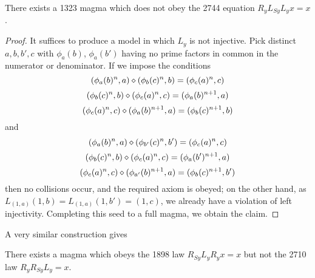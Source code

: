 \begin{corollary}\label{1323-refute-2744}  There exists a 1323 magma which does not obey the 2744 equation $R_y L_{Sy} L_y x = x$.
\end{corollary}

\begin{proof} It suffices to produce a model in which $L_y$ is not injective. Pick distinct $a, b, b', c$ with $\phi_a(b)$, $\phi_a(b')$ having no prime factors in common in the numerator or denominator.  If we impose the conditions
$$ (\phi_a(b)^n,a) \diamond (\phi_b(c)^n,b) = (\phi_c(a)^n,c)$$
$$ (\phi_b(c)^n,b) \diamond (\phi_c(a)^n,c) = (\phi_a(b)^{n+1}, a)$$
$$ (\phi_c(a)^n,c) \diamond (\phi_a(b)^{n+1}, a) = (\phi_b(c)^{n+1},b)$$
and
$$ (\phi_a(b)^n,a) \diamond (\phi_{b'}(c)^n,b') = (\phi_c(a)^n,c)$$
$$ (\phi_b(c)^n,b) \diamond (\phi_c(a)^n,c) = (\phi_a(b')^{n+1}, a)$$
$$ (\phi_c(a)^n,c) \diamond (\phi_{a'}(b)^{n+1}, a) = (\phi_b(c)^{n+1},b')$$
then no collisions occur, and the required axiom is obeyed; on the other hand, as $L_{(1,a)} (1,b) = L_{(1,a)} (1,b') = (1,c)$, we already have a violation of left injectivity.  Completing this seed to a full magma, we obtain the claim.
\end{proof}

A very similar construction gives

\begin{corollary}\label{1898-refute-1729}  There exists a magma which obeys the 1898 law $R_{Sy} L_y R_y x = x$ but not the 2710 law $R_y R_{Sy} L_y = x$.
\end{corollary}

